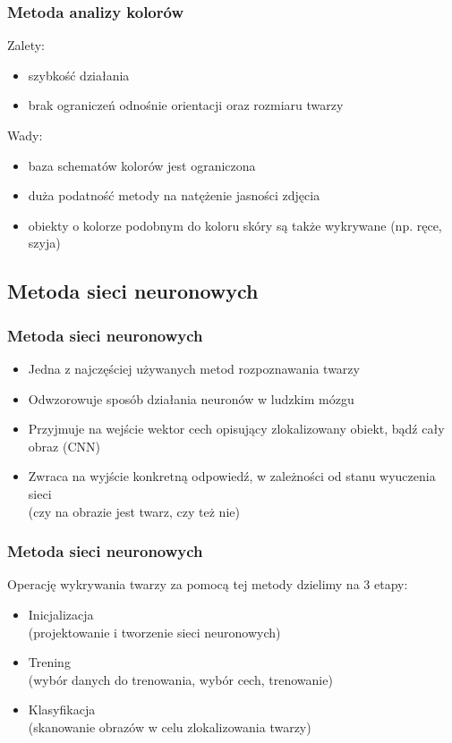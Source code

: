 \documentclass[xcolor=table]{beamer}
\begin{document}
\begin{frame}
  \frametitle{Metoda analizy kolorów}

Zalety:
\begin{itemize}
	\item szybkość działania
	\item brak ograniczeń odnośnie orientacji oraz rozmiaru twarzy
\end{itemize}

\vspace{10pt}
 {
Wady:
\begin{itemize}
\item baza schematów kolorów jest ograniczona
\item duża podatność metody na natężenie jasności zdjęcia
\item obiekty o kolorze podobnym do koloru skóry są także wykrywane (np. ręce, szyja)
\end{itemize}
}

\end{frame}

\subsection{Metoda sieci neuronowych}
\begin{frame}
  \frametitle{Metoda sieci neuronowych}

\begin{itemize}
\item Jedna z najczęściej używanych metod rozpoznawania twarzy
\item Odwzorowuje sposób działania neuronów w ludzkim mózgu
\item Przyjmuje na wejście wektor cech opisujący zlokalizowany obiekt, bądź cały obraz (CNN)
\item Zwraca na wyjście konkretną odpowiedź, w zależności od stanu wyuczenia sieci\\ (czy na obrazie jest twarz, czy też nie)
\end{itemize}

\end{frame}

\begin{frame}
  \frametitle{Metoda sieci neuronowych}

Operację wykrywania twarzy za pomocą tej metody dzielimy na 3 etapy:
\begin{itemize}
\item Inicjalizacja\\ (projektowanie i tworzenie sieci neuronowych)
\item Trening\\ (wybór danych do trenowania, wybór cech, trenowanie)
\item Klasyfikacja\\ (skanowanie obrazów w celu zlokalizowania twarzy)
\end{itemize}

\end{frame}
\end{document}
